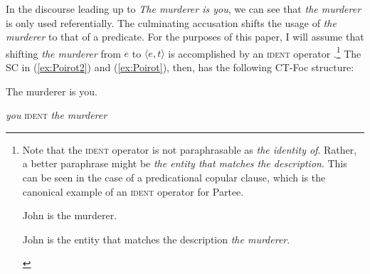 \documentclass[
]{RCL}
\begin{document}
In the discourse leading up to \textit{The murderer is you}, we can see that \textit{the murderer} is only used referentially.
The culminating accusation shifts the usage of \textit{the murderer} to that of a predicate.
For the purposes of this paper, I will assume that shifting \textit{the murderer} from $e$ to $\langle e, t\rangle$ is accomplished by an \textsc{ident} operator \citep[cf.][]{partee1987noun}.\footnote{
	Note that the \textsc{ident} operator is not paraphrasable as \textit{the identity of}.
	Rather, a better paraphrase might be \textit{the entity that matches the description}.
	This can be seen in the case of a predicational copular clause, which is the canonical example of an \textsc{ident} operator for Partee.
	\begin{xlisti}
		\ex John is the murderer.
		\begin{xlista}
			\ex John is the entity that matches the description \textit{the murderer}.
		\end{xlista}
	\end{xlisti}
}
The SC in (\ref{ex:Poirot2}) and (\ref{ex:Poirot}), then, has the following CT-Foc structure:
\begin{exe}
\ex The murderer is you.
\begin{xlist}
 \textit{you}
 \textsc{ident}
 \textit{the murderer}	
\end{xlist}	
\end{exe}
\end{document}
